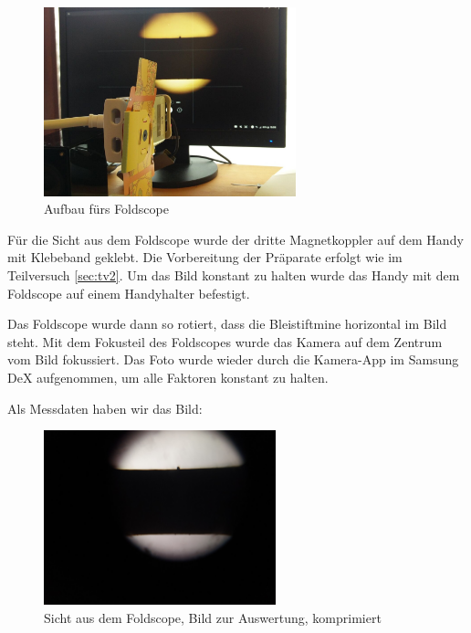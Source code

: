 			\begin{figure}[H]
				\centering
				\includegraphics[width=0.65\textwidth]{images/tv3/tv3-aufbau-03.jpg}
				\caption{Aufbau fürs Foldscope}
				\label{fig:tv3-nah-aufbau}
				\vspace{-15pt}
			\end{figure}
			Für die Sicht aus dem Foldscope wurde der dritte Magnetkoppler auf dem Handy mit Klebeband geklebt. Die Vorbereitung der Präparate erfolgt wie im Teilversuch \ref{sec:tv2}. Um das Bild konstant zu halten wurde das Handy mit dem Foldscope auf einem Handyhalter befestigt. 

			Das Foldscope wurde dann so rotiert, dass die Bleistiftmine horizontal im Bild steht. Mit dem Fokusteil des Foldscopes wurde das Kamera auf dem Zentrum vom Bild fokussiert. Das Foto wurde wieder durch die Kamera-App im Samsung DeX aufgenommen, um alle Faktoren konstant zu halten. 

			Als Messdaten haben wir das Bild:
			\begin{figure}[H]
				\centering
				\includegraphics[width=0.6\textwidth,angle=180,origin=c]{images/tv3/foldscope.jpg}
				\caption{Sicht aus dem Foldscope, Bild zur Auswertung, komprimiert}
				\label{fig:tv3-data-scope}
				\vspace{-10pt}
			\end{figure}
			\newpage
